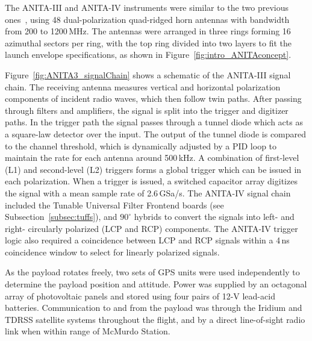 The ANITA-III and ANITA-IV instruments were similar to the two previous
ones~\cite{ANITA1paper,ANITA2paper}, using 48 dual-polarization quad-ridged horn antennas with bandwidth from 200 to 1200\,MHz. 
The antennas were arranged in three rings forming 16 azimuthal sectors per ring, with the top ring divided into two layers to fit the launch envelope specifications, as shown in Figure~\ref{fig:intro_ANITAconcept}.

Figure~\ref{fig:ANITA3_signalChain} shows a schematic of the ANITA-III signal chain. 
The receiving antenna measures vertical and horizontal polarization components of incident radio waves, which then follow twin paths. 
After passing through filters and amplifiers, the signal is split into
the trigger and digitizer paths.
In the trigger path the signal passes
through a tunnel diode which acts as a square-law detector over the
input. The output of the tunnel diode is compared to the channel
threshold, which is dynamically adjusted by a PID loop to maintain the
rate for each antenna around 500\,kHz. A combination of first-level (L1) and second-level (L2) triggers forms a
global trigger which can be issued in each polarization.
When a trigger is issued, a switched capacitor array digitizes the signal with a mean sample rate of 2.6\,GSa/s. 
The ANITA-IV signal chain included the Tunable Universal Filter Frontend boards (see Subsection~\ref{subsec:tuffs}), and $90^{\circ}$ hybrids to convert the signals into left- and right- circularly polarized (LCP and RCP) components. 
The ANITA-IV trigger logic also required a coincidence between LCP and RCP signals within a 4\,ns coincidence window to select for linearly polarized signals. 

As the payload rotates freely, two sets of GPS units were used
independently to determine the
payload position and attitude.
Power was supplied by an octagonal array of photovoltaic panels and stored using four pairs of 12-V lead-acid batteries.
Communication to and from the payload was through the Iridium and TDRSS satellite systems throughout the flight, and by a direct line-of-sight radio link when within range of McMurdo Station.




